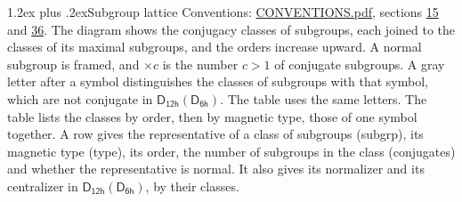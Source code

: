 \documentclass[10pt,a4paper]{article}
\makeatletter
\renewcommand\section{\@startsection{section}{1}{\z@}{-3ex plus -1ex minus -.2ex}%
  {1.2ex plus .2ex}{\normalfont\large\sffamily\bfseries\color{parttitle}}}
\numberwithin{equation}{section}
\newcommand{\grp}[1]{\mathsf{#1}}
\makeatother
\begin{document}
\section{Subgroup lattice}\label{s:subgroups}
Conventions: \href{../../CONVENTIONS.pdf}{CONVENTIONS.pdf}, sections \href{../../../rotation/CONVENTIONS.pdf\#conv.15}{15} and \href{../../CONVENTIONS.pdf\#conv.36}{36}.
The diagram shows the conjugacy classes of subgroups, each joined to the classes of its maximal subgroups, and the orders increase upward. \label{n:index.conjugates.c}\label{n:mark.conjugates}A normal subgroup is framed, and ${\times}c$ is the number $c > 1$ of conjugate subgroups. \label{n:mark.letter}A gray letter after a symbol distinguishes the classes of subgroups with that symbol, which are not conjugate in $\grp{D_{12h}}(\grp{D_{6h}})$. The table uses the same letters. The table lists the classes by order, then by magnetic type, those of one symbol together. \label{n:head.subgroup}\label{n:head.magnetic.type}\label{n:head.order}\label{n:head.conjugates}\label{n:head.normal}A row gives the representative of a class of subgroups (subgrp), its magnetic type (type), its order, the number of subgroups in the class (conjugates) and whether the representative is normal. \label{n:head.normalizer}\label{n:head.centralizer}It also gives its normalizer and its centralizer in $\grp{D_{12h}}(\grp{D_{6h}})$, by their classes. 
\end{document}
